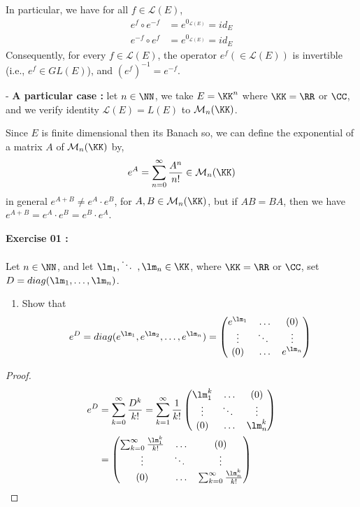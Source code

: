 \divider
 In particular, we have for all 
 $f \in  \mathcal{L} (E)  $, 
 \begin{align*}
	 e^{f} \circ e^{-f} &= 
 e^{0_{\mathcal{L} (E) }} = 
 id_{E} \\
	 e^{-f} \circ  e^{f} &= 
 e^{0_{\mathcal{L} (E) }} = id_{E}
 \end{align*}
 Consequently, for every 
 $f \in \mathcal{L} (E)  $, the operator 
 $e ^{f} (\in  \mathcal{L} (E) )  $ is invertible
 (i.e., $e^{f} \in GL(E)   $), and 
 $\left( e^{f} \right)^{-1} = e^{-f}$. 

 - \textbf{A particular case : } let $n \in \NN $, 
 we take $E = \KK^{n} $ where $\KK = \RR  $ or 
 $\CC  $, and we verify identity 
 $\mathcal{L} (E)  = L(E)  $ to 
 $\mathcal{M}_n  (\KK) $.

 Since $E $ is finite dimensional then its Banach so,
 we can define the exponential of a matrix
 $A $ of $\mathcal{M} _{n}(\KK)  $ by, 
 \[
 e^{A} = 
 \sum_{n=0}^{\infty}  \frac{A^{n}}{n!} \in 
 \mathcal{M}_{n}(\KK)  
 \]
 in general $e^{A+B} \neq  e^{A} \cdot e^{B} $, for 
 $A,B \in  \mathcal{M}_n  (\KK)  $, but 
 if $AB = BA $, then we have 
 $e^{A+B}= e^{A} \cdot e^{B}= e^{B} \cdot e^{A}$.
 \\
 \begin{center}
 	\textbf{Exercise 01 : }
 \end{center}
 Let $n \in \NN $, and let $\lm_1, \ddots , \lm_n 
 \in \KK$, where $\KK = \RR  $ or $\CC  $, 
 set $D = diag(\lm_1, \hdots , \lm_n )$. 
 \begin{enumerate}[(1)]
 \item Show that 
	 \[
	 e^{D}= 
	 diag(e^{\lm_1}, e^{\lm_2}, \hdots , 
	 e^{\lm_n })  
	 = 
	\begin{pmatrix}
		e^{\lm_1} & \hdots  & (0)  \\
		\vdots  & \ddots  & \vdots  \\
		(0)   & \hdots  & 
		e^{\lm_n }\\
	\end{pmatrix}
	 \]
 \end{enumerate}
 \begin{proof}
 \begin{align*}
	 e^{D} &= 
	\sum_{k=0}^{\infty}  
	\frac{D^{k}}{k!} = 
	\sum_{k=1}^{\infty}  
	\frac{1}{k!} 
	\begin{pmatrix}
		\lm_1^{k} & \hdots   &(0)   \\
		\vdots  & \ddots  & \vdots  \\
		(0)  & \hdots  & \lm_n ^k  \\
	\end{pmatrix}
	\\
	       &= 
	\begin{pmatrix}
		\sum_{k=0}^{\infty}  
	\frac{\lm_1^k }{k!}& \hdots  & (0)  \\
		\vdots  & \ddots  & \vdots   \\
		(0)  & \hdots  & 
	\sum_{k=0}^{\infty}  \frac{\lm_n ^k }{k!}\\
	\end{pmatrix}
 \end{align*}
 \end{proof}
